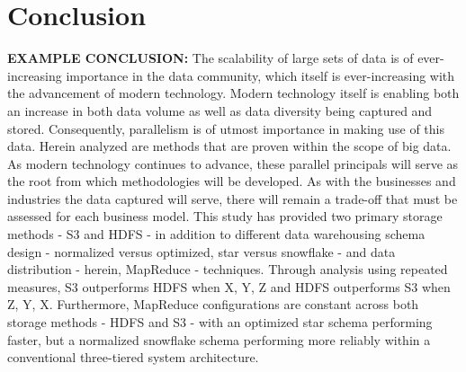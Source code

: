 \documentclass[journal]{IEEEtran}
\begin{document}
	\section{Conclusion}
	\textbf{EXAMPLE CONCLUSION:}
	The scalability of large sets of data is of ever-increasing importance in the data community, which itself is ever-increasing with the advancement of modern technology. Modern technology itself is enabling both an increase in both data volume as well as data diversity being captured and stored. Consequently, parallelism is of utmost importance in making use of this data. Herein analyzed are methods that are proven within the scope of big data. As modern technology continues to advance, these parallel principals will serve as the root from which methodologies will be developed. As with the businesses and industries the data captured will serve, there will remain a trade-off that must be assessed for each business model. This study has provided two primary storage methods - S3 and HDFS - in addition to different data warehousing schema design - normalized versus optimized, star versus snowflake - and data distribution - herein, MapReduce - techniques. Through analysis using repeated measures, S3 outperforms HDFS when X, Y, Z and HDFS outperforms S3 when Z, Y, X. Furthermore, MapReduce configurations are constant across both storage methods - HDFS and S3 - with an optimized star schema performing faster, but a normalized snowflake schema performing more reliably within a conventional three-tiered system architecture.
	
	\ifCLASSOPTIONcaptionsoff
	\newpage
	\fi
	
\end{document}
